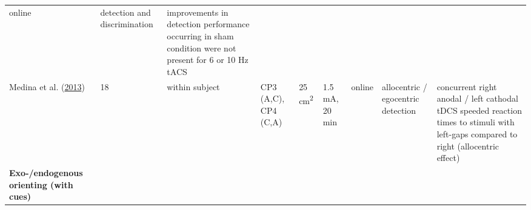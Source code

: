 \documentclass[11pt,]{memoir}
\begin{document}
\begin{longtable}[]{@{}lllllllll@{}}
\begin{minipage}[t]{0.05\columnwidth}
online\strut
\end{minipage} & \begin{minipage}[t]{0.11\columnwidth}\raggedright
detection and
discrimination\strut
\end{minipage} & \begin{minipage}[t]{0.24\columnwidth}\raggedright
improvements in detection performance occurring in sham
condition were not present for 6 or 10 Hz tACS\strut
\end{minipage}\tabularnewline
\begin{minipage}[t]{0.12\columnwidth}\raggedright
Medina et al. (\protect\hyperlink{ref-Medina2013}{2013})\strut
\end{minipage} & \begin{minipage}[t]{0.02\columnwidth}\raggedright
18\strut
\end{minipage} & \begin{minipage}[t]{0.04\columnwidth}\raggedright
within
subject\strut
\end{minipage} & \begin{minipage}[t]{0.11\columnwidth}\raggedright
CP3 (A,C), CP4 (C,A)\strut
\end{minipage} & \begin{minipage}[t]{0.03\columnwidth}\raggedright
25
cm\textsuperscript{2}\strut
\end{minipage} & \begin{minipage}[t]{0.05\columnwidth}\raggedright
1.5 mA, 20
min\strut
\end{minipage} & \begin{minipage}[t]{0.05\columnwidth}\raggedright
online\strut
\end{minipage} & \begin{minipage}[t]{0.11\columnwidth}\raggedright
allocentric / egocentric
detection\strut
\end{minipage} & \begin{minipage}[t]{0.24\columnwidth}\raggedright
concurrent right anodal / left cathodal tDCS speeded
reaction times to stimuli with left-gaps compared to right
(allocentric effect)\strut
\end{minipage}\tabularnewline
\begin{minipage}[t]{0.12\columnwidth}\raggedright
\textbf{Exo-/endogenous orienting
(with cues)}\strut
\end{minipage} & \begin{minipage}[t]{0.02\columnwidth}\raggedright
\strut
\end{minipage} & \begin{minipage}[t]{0.04\columnwidth}\raggedright

\end{minipage}
\end{longtable}
\end{document}
